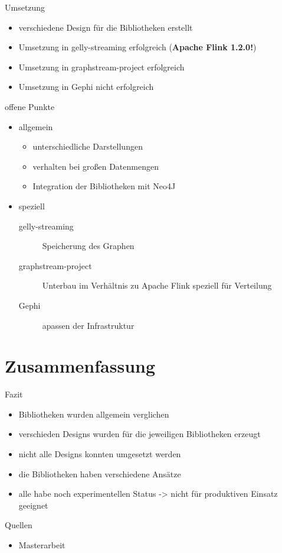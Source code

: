 \documentclass[a4paper, fontsize=11pt]{beamer}
\begin{document}
\begin{frame}{Umsetzung}
    \begin{itemize}
        \item verschiedene Design für die Bibliotheken erstellt
        \item Umsetzung in gelly-streaming erfolgreich (\textbf{Apache Flink 1.2.0!})
        \item Umsetzung in graphstream-project erfolgreich
        \item Umsetzung in Gephi nicht erfolgreich
    \end{itemize}
\end{frame}

\begin{frame}{offene Punkte}
    \begin{itemize}
        \item allgemein
            \begin{itemize}
                \item unterschiedliche Darstellungen
                \item verhalten bei großen Datenmengen
                \item Integration der Bibliotheken mit Neo4J
            \end{itemize}
        \item speziell
            \begin{description}
                \item[gelly-streaming] Speicherung des Graphen
                \item[graphstream-project] Unterbau im Verhältnis zu Apache Flink
                    speziell für Verteilung
                \item[Gephi] apassen der Infrastruktur
            \end{description}
    \end{itemize}
\end{frame}

\section{Zusammenfassung}
\begin{frame}{Fazit}
    \begin{itemize}
        \item Bibliotheken wurden allgemein verglichen
        \item verschieden Designs wurden für die jeweiligen Bibliotheken erzeugt
        \item nicht alle Designs konnten umgesetzt werden
        \item die Bibliotheken haben verschiedene Ansätze
        \item alle habe noch experimentellen Status -> nicht für produktiven
            Einsatz geeignet
    \end{itemize}
\end{frame}

\begin{frame}{Quellen}
    \begin{itemize}
        \item Masterarbeit
    \end{itemize}
\end{frame}
\end{document}
